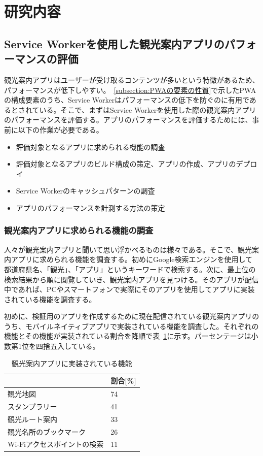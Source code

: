 \section{研究内容}
\label{section:研究内容}
\subsection{Service Workerを使用した観光案内アプリのパフォーマンスの評価}
\label{subsection:Service Workerを使用した観光案内アプリのパフォーマンスの評価}
観光案内アプリはユーザーが受け取るコンテンツが多いという特徴があるため、パフォーマンスが低下しやすい。~\autoref{subsection:PWAの要素の性質}で示したPWAの構成要素のうち、Service Workerはパフォーマンスの低下を防ぐのに有用であるとされている。そこで、まずはService Workerを使用した際の観光案内アプリのパフォーマンスを評価する。アプリのパフォーマンスを評価するためには、事前に以下の作業が必要である。
\begin{itemize}
    \item 評価対象となるアプリに求められる機能の調査
    \item 評価対象となるアプリのビルド構成の策定、アプリの作成、アプリのデプロイ
    \item Service Workerのキャッシュパターンの調査
    \item アプリのパフォーマンスを計測する方法の策定
\end{itemize}
\subsubsection{観光案内アプリに求められる機能の調査}
\label{subsubsection:観光案内アプリに求められる機能の調査}
人々が観光案内アプリと聞いて思い浮かべるものは様々である。そこで、観光案内アプリに求められる機能を調査する。初めにGoogle検索エンジンを使用して都道府県名、「観光」、「アプリ」というキーワードで検索する。次に、最上位の検索結果から順に閲覧していき、観光案内アプリを見つける。そのアプリが配信中であれば、PCやスマートフォンで実際にそのアプリを使用してアプリに実装されている機能を調査する。

初めに、検証用のアプリを作成するために現在配信されている観光案内アプリのうち、モバイルネイティブアプリで実装されている機能を調査した。それぞれの機能とその機能が実装されている割合を降順で表~\ref{table:観光案内アプリに実装されている機能}に示す。パーセンテージは小数第1位を四捨五入している。
\begin{table}
  \caption{観光案内アプリに実装されている機能}
  \label{table:観光案内アプリに実装されている機能}
  \centering
  \begin{tabular}{|p{15em}|p{10em}|}
    \hline
    & 割合[\%] \\ \hline
    観光地図 & 74 \\ \hline
    スタンプラリー & 41\\ \hline
    観光ルート案内 & 33\\ \hline
    観光名所のブックマーク & 26\\ \hline
    Wi-Fiアクセスポイントの検索 & 11 \\ \hline
  \end{tabular}
\end{table}

